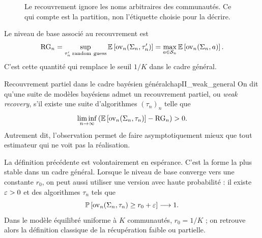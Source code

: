 \begin{figure}[H]
\centering
{}
\caption{Le recouvrement ignore les noms arbitraires des communautés. Ce qui compte est la partition, non l'étiquette choisie pour la décrire.}
\label{fig:chapII_overlap}
\end{figure}

Le niveau de base associé au recouvrement est
\begin{equation}
    \operatorname{RG}_n
    =
    \sup_{\tau_n'\;\mathrm{random\ guess}}
    \mathbb E\left[\operatorname{ov}_n(\Sigma_n,\tau_n')\right]
    =
    \max_{a\in\mathcal S_n}\mathbb E\left[\operatorname{ov}_n(\Sigma_n,a)\right].
    \label{eq:chapII_RG_overlap}
\end{equation}
C'est cette quantité qui remplace le seuil $1/K$ dans le cadre général.

\begin{Definition}{Recouvrement partiel dans le cadre bayésien général}{chapII_weak_general}
On dit qu'une suite de modèles bayésiens admet un recouvrement partiel, ou \emph{weak recovery}, s'il existe une suite d'algorithmes $(\tau_n)_n$ telle que
\begin{equation}
    \liminf_{n\to\infty}
    \left(
        \mathbb E\left[\operatorname{ov}_n(\Sigma_n,\tau_n)\right]-\operatorname{RG}_n
    \right)>0.
    \label{eq:chapII_weak_general}
\end{equation}
Autrement dit, l'observation permet de faire asymptotiquement mieux que tout estimateur qui ne voit pas la réalisation.
\end{Definition}

La définition précédente est volontairement en espérance. C'est la forme la plus stable dans un cadre général. Lorsque le niveau de base converge vers une constante $r_0$, on peut aussi utiliser une version avec haute probabilité : il existe $\varepsilon>0$ et des algorithmes $\tau_n$ tels que
\begin{equation}
    \mathbb P\left[\operatorname{ov}_n(\Sigma_n,\tau_n)\ge r_0+\varepsilon\right]\longrightarrow1.
    \label{eq:chapII_weak_high_probability}
\end{equation}
Dans le modèle équilibré uniforme à $K$ communautés, $r_0=1/K$ ; on retrouve alors la définition classique de la récupération faible ou partielle.

